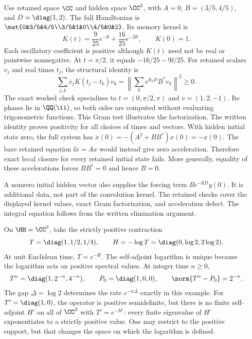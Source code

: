Use retained space $\CC$ and hidden space $\CC^2$, with $A=0$, $B=(3/5,4/5)$, and $D=\diag(1,2)$. The full Hamiltonian is $\mat{0&3/5&4/5\\3/5&1&0\\4/5&0&2}$. Its memory kernel is
\[
K(t)=\frac9{25}e^{-\ii t}+\frac{16}{25}e^{-2\ii t},
\qquad K(0)=1.
\]
Each oscillatory coefficient is positive although $K(t)$ need not be real or pointwise nonnegative. At $t=\pi/2$, it equals $-16/25-9\ii/25$.
For retained scalars $v_j$ and real times $t_j$, the structural identity is
\[
\sum_{j,k}\overline v_jK(t_j-t_k)v_k
=\left\|\sum_k e^{\ii t_kD}B^*v_k\right\|^2\geq0.
\]
The exact worked check specializes to $t=(0,\pi/2,\pi)$ and $v=(1,2,-1)$. Its phases lie in $\QQ(\ii)$, so both sides are computed without evaluating trigonometric functions. This Gram test illustrates the factorization. The written identity proves positivity for all choices of times and vectors.
With hidden initial state zero, the full system has $\ddot x(0)=-(A^2+BB^*)x(0)=-x(0)$. The bare retained equation $\ii\dot x=Ax$ would instead give zero acceleration. Therefore exact local closure for every retained initial state fails. More generally, equality of these accelerations forces $BB^*=0$ and hence $B=0$.

A nonzero initial hidden vector also supplies the forcing term $Be^{-\ii tD}y(0)$. It is additional data, not part of the convolution kernel. The retained checks cover the displayed kernel values, exact Gram factorization, and acceleration defect. The integral equation follows from the written elimination argument.

On $\HH=\CC^3$, take the strictly positive contraction
\[
T=\diag(1,1/2,1/4),\qquad H=-\log T=\diag(0,\log2,2\log2).
\]
At unit Euclidean time, $T=e^{-H}$. The self-adjoint logarithm is unique because the logarithm acts on positive spectral values. At integer time $n\geq0$,
\[
T^n=\diag(1,2^{-n},4^{-n}),\qquad
P_0=\diag(1,0,0),\qquad\norm{T^n-P_0}=2^{-n}.
\]
The gap $\Delta=\log2$ determines the rate $e^{-n\Delta}$ exactly in this example.
For $T'=\diag(1,0)$, the operator is positive semidefinite, but there is no finite self-adjoint $H'$ on all of $\CC^2$ with $T'=e^{-H'}$: every finite eigenvalue of $H'$ exponentiates to a strictly positive value. One may restrict to the positive support, but that changes the space on which the logarithm is defined.

